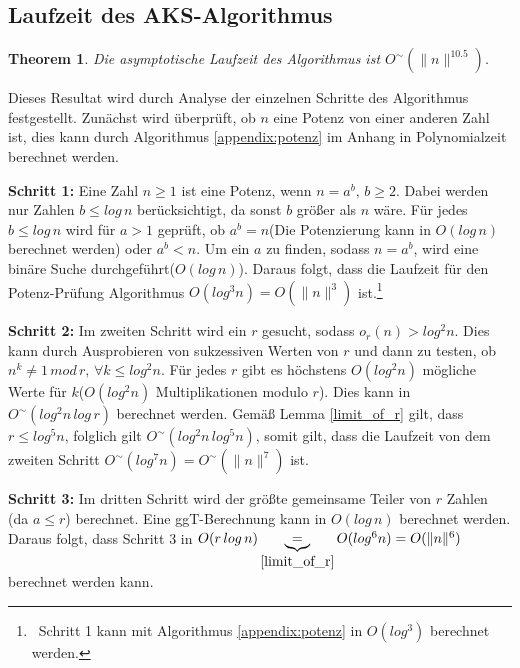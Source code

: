 \documentclass[12pt,oneside]{article}
\newtheorem{theorem}{Theorem}[section]
\theoremstyle{remark}
\theoremstyle{definition}
\begin{document}
\subsection{Laufzeit des AKS-Algorithmus}
\begin{theorem}
Die asymptotische Laufzeit des Algorithmus ist $O^{\sim}(\lVert n \rVert^{10.5})$. 
\end{theorem}


Dieses Resultat wird durch Analyse der einzelnen Schritte des Algorithmus festgestellt. Zunächst wird überprüft, ob $n$ eine Potenz von einer anderen Zahl ist, dies kann durch Algorithmus \ref{appendix:potenz} im Anhang in Polynomialzeit berechnet werden.

\textbf{Schritt 1:}\newline
Eine Zahl $n \geq 1$ ist eine Potenz, wenn $ n  = a^b, \, b \geq 2$. Dabei werden nur Zahlen $b \leq log \, n$ berücksichtigt, da sonst $b$ größer als $n$ wäre. Für jedes $b \leq log \,  n$ wird für $a > 1$ geprüft, ob $a^b = n$(Die Potenzierung kann in $O(log \, n)$ berechnet werden) oder $a^b < n$. Um ein $a$ zu finden, sodass $ n = a^b$, wird eine binäre Suche durchgeführt($O(log \, n)$). Daraus folgt, dass die Laufzeit für den Potenz-Prüfung Algorithmus $O(log^3 n) = O(\lVert n \rVert^3)$ ist.\footnote{$\,$ Schritt 1 kann mit Algorithmus \ref{appendix:potenz} in $O(log^3)$ berechnet werden.}\newline 


\textbf{Schritt 2:}\newline
Im zweiten Schritt wird ein $r$ gesucht, sodass $o_{r}(n) > log^2 n$. Dies kann durch Ausprobieren von sukzessiven Werten von $r$ und dann zu testen, ob $n^k \neq 1 \,  mod \, r, \, \forall k \leq log^2 n$. Für jedes $r$ gibt es höchstens $O(log^2 n)$ mögliche Werte für $k$($O(log^2n)$ Multiplikationen modulo $r$). Dies kann in $O^{\sim}(log^2 n \, log \, r)$ berechnet werden.\newline\newline
Gemäß Lemma \ref{limit_of_r} gilt, dass $ r \leq log^5 n$, folglich gilt $O^{\sim}(log^2 n \, log^5 n)$, somit gilt, dass die Laufzeit von dem zweiten Schritt $O^{\sim}(log^7 n) = O^{\sim}(\lVert n \rVert^7)$ ist. 


\textbf{Schritt 3:}\newline
Im dritten Schritt wird der größte gemeinsame Teiler von $r$ Zahlen (da $a \leq r$) berechnet. Eine ggT-Berechnung kann in $O(log \,n)$ berechnet werden\cite{D73}. Daraus folgt, dass Schritt 3 in $O(r \, log \, n) \underbrace{=}_{\ref{limit_of_r}} O(log^6 n) = O(\lVert n \rVert^6)$ berechnet werden kann. 
\end{document}
